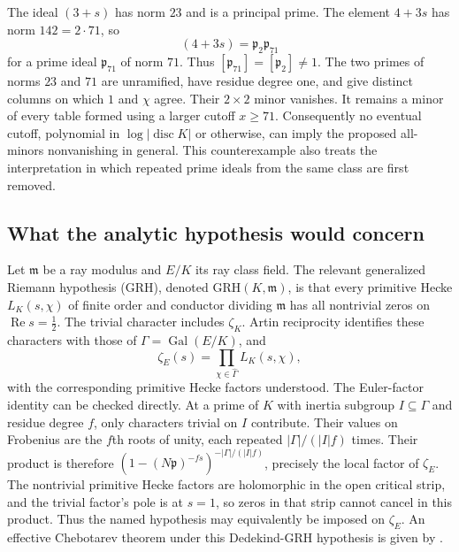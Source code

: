 The ideal $(3+s)$ has norm $23$ and is a principal prime.
The element $4+3s$ has norm $142=2\cdot71$, so
\[
 (4+3s)=\mathfrak p_2\mathfrak p_{71}
\]
for a prime ideal $\mathfrak p_{71}$ of norm $71$.
Thus $[\mathfrak p_{71}]=[\mathfrak p_2]\ne1$.
The two primes of norms $23$ and $71$ are unramified, have residue
degree one, and give distinct columns on which $1$ and $\chi$ agree.
Their $2\times2$ minor vanishes. It remains a minor of every table
formed using a larger cutoff $x\ge71$.
Consequently no eventual cutoff, polynomial in $\log|\operatorname{disc}K|$
or otherwise, can imply the proposed all-minors nonvanishing in general.
This counterexample also treats the interpretation in which repeated
prime ideals from the same class are first removed.

\subsection{What the analytic hypothesis would concern}
Let $\mathfrak m$ be a ray modulus and $E/K$ its ray class field.
The relevant generalized Riemann hypothesis (GRH), denoted
$\mathrm{GRH}(K,\mathfrak m)$, is that every primitive Hecke
$L_K(s,\chi)$ of finite order and
 conductor dividing $\mathfrak m$ has all nontrivial zeros on
 $\operatorname{Re}s=\tfrac12$.
The trivial character includes $\zeta_K$. Artin reciprocity identifies
these characters with those of $\Gamma=\operatorname{Gal}(E/K)$, and
\[
 \zeta_E(s)=\prod_{\chi\in\widehat\Gamma}L_K(s,\chi),
\]
with the corresponding primitive Hecke factors understood.
The Euler-factor identity can be checked directly. At a prime of $K$
with inertia subgroup $I\subseteq\Gamma$ and residue degree $f$,
only characters trivial on $I$ contribute. Their values on Frobenius
are the $f$th roots of unity, each repeated $|\Gamma|/(|I|f)$ times.
Their product is therefore
$(1-(N\mathfrak p)^{-fs})^{-|\Gamma|/(|I|f)}$, precisely the local
factor of $\zeta_E$. The nontrivial primitive Hecke factors are
holomorphic in the open critical strip, and the trivial factor's pole
is at $s=1$, so zeros in that strip cannot cancel in this product.
Thus the named hypothesis may equivalently be imposed on $\zeta_E$.
An effective Chebotarev theorem under this Dedekind-GRH hypothesis is
given by \citet[Theorem~1.1 and Corollary~1.2, corrected author version~3,
pp.~2--3]{GrenieMolteni2019}.

